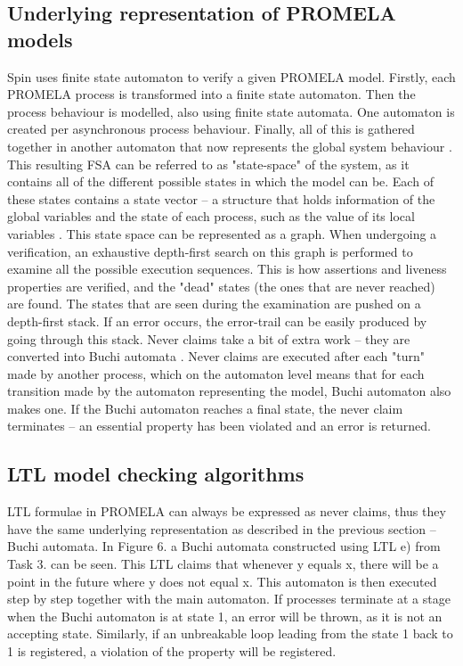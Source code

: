 \documentclass{report}
\newcommand{\tab}{\hspace*{3em}}
\begin{document}
\subsection*{Underlying representation of PROMELA models}
\tab Spin uses finite state automaton to verify a given PROMELA model. Firstly, each PROMELA process is transformed into a finite state automaton. Then the process behaviour is modelled, also using finite state automata. One automaton is created per asynchronous process behaviour. Finally, all of this is gathered together in another automaton that now represents the global system behaviour \cite{Holzmann}. This resulting FSA can be referred to as "state-space" of the system, as it contains all of the different possible states in which the model can be. Each of these states contains a state vector -- a structure that holds information of the global variables and the state of each process, such as the value of its local variables \cite{lect}. This state space can be represented as a graph. When undergoing a verification, an exhaustive depth-first search on this graph is performed to examine all the possible execution sequences. This is how assertions and liveness properties are verified, and the "dead" states (the ones that are never reached) are found. The states that are seen during the examination are pushed on a depth-first stack. If an error occurs, the error-trail can be easily produced by going through this stack. Never claims take a bit of extra work -- they are converted into Buchi automata \cite{KP}. Never claims are executed after each "turn" made by another process, which on the automaton level means that for each transition made by the automaton representing the model, Buchi automaton also makes one. If the Buchi automaton reaches a final state, the never claim terminates -- an essential property has been violated and an error is returned.

\subsection*{LTL model checking algorithms}
\tab LTL formulae in PROMELA can always be expressed as never claims, thus they have the same underlying representation as described in the previous section -- Buchi automata. In Figure 6. a Buchi automata constructed using LTL e) from Task 3. can be seen. This LTL claims that whenever y equals x, there will be a point in the future where y does not equal x. This automaton is then executed step by step together with the main automaton. If processes terminate at a stage when the Buchi automaton is at state 1, an error will be thrown, as it is not an accepting state. Similarly, if an unbreakable loop leading from the state 1 back to 1 is registered, a violation of the property will be registered.
\end{document}

